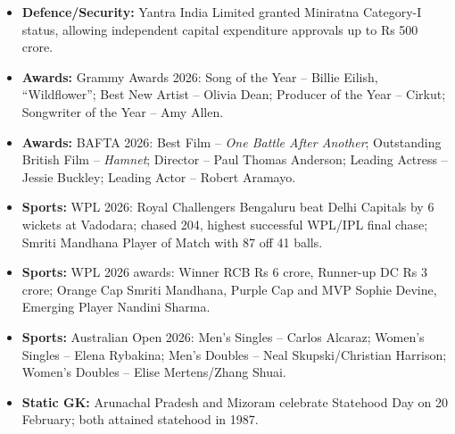 \documentclass[10pt,a4paper]{article}
\begin{document}
\begin{itemize}
    \item \textbf{Defence/Security:} Yantra India Limited granted Miniratna Category-I status, allowing independent capital expenditure approvals up to Rs 500 crore.
    \item \textbf{Awards:} Grammy Awards 2026: Song of the Year -- Billie Eilish, ``Wildflower''; Best New Artist -- Olivia Dean; Producer of the Year -- Cirkut; Songwriter of the Year -- Amy Allen.
    \item \textbf{Awards:} BAFTA 2026: Best Film -- \textit{One Battle After Another}; Outstanding British Film -- \textit{Hamnet}; Director -- Paul Thomas Anderson; Leading Actress -- Jessie Buckley; Leading Actor -- Robert Aramayo.
    \item \textbf{Sports:} WPL 2026: Royal Challengers Bengaluru beat Delhi Capitals by 6 wickets at Vadodara; chased 204, highest successful WPL/IPL final chase; Smriti Mandhana Player of Match with 87 off 41 balls.
    \item \textbf{Sports:} WPL 2026 awards: Winner RCB Rs 6 crore, Runner-up DC Rs 3 crore; Orange Cap Smriti Mandhana, Purple Cap and MVP Sophie Devine, Emerging Player Nandini Sharma.
    \item \textbf{Sports:} Australian Open 2026: Men's Singles -- Carlos Alcaraz; Women's Singles -- Elena Rybakina; Men's Doubles -- Neal Skupski/Christian Harrison; Women's Doubles -- Elise Mertens/Zhang Shuai.
    \item \textbf{Static GK:} Arunachal Pradesh and Mizoram celebrate Statehood Day on 20 February; both attained statehood in 1987.
\end{itemize}
\end{document}
